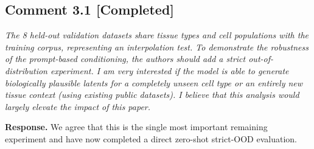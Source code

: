 \documentclass[11pt,letterpaper]{article}
\newcommand{\statuscompleted}{\textcolor{statusgreen}{\textbf{[Completed]}}}
\begin{document}
\subsection*{Comment 3.1 \hfill \statuscompleted}

\begin{reviewercomment}
\itshape
The 8 held-out validation datasets share tissue types and cell populations with the training corpus, representing an interpolation test. To demonstrate the robustness of the prompt-based conditioning, the authors should add a strict out-of-distribution experiment. I am very interested if the model is able to generate biologically plausible latents for a completely unseen cell type or an entirely new tissue context (using existing public datasets). I believe that this analysis would largely elevate the impact of this paper.
\end{reviewercomment}

\noindent\textbf{Response.}
We agree that this is the single most important remaining experiment and have now completed a direct zero-shot strict-OOD evaluation.
\end{document}
